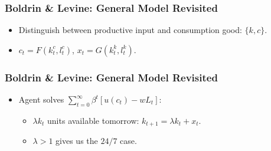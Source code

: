 \documentclass{beamer}
\begin{document}
\begin{frame}[t]
  \frametitle{Boldrin \& Levine: General Model Revisited}
  \begin{itemize}
    \item<+-> Distinguish between productive input and consumption good: $\{k,c\}$.
    \item<+-> $c_t = F(k_t^c,l_t^c)$, $x_t = G(k_t^k,l_t^k)$.
  \end{itemize}
\end{frame}

\begin{frame}[t]
  \frametitle{Boldrin \& Levine: General Model Revisited}
  \begin{itemize}
	  \item<+-> Agent solves $\sum_{t=0}^\infty\beta^t[u(c_t)-wL_t]$:
	  \begin{itemize}
        \item<+-> $\lambda k_t$ units available tomorrow: $k_{t+1} = \lambda k_t + x_t$.
	    \item<+-> $\lambda > 1$ gives us the $24/7$ case.
	  \end{itemize}
  \end{itemize}
\end{frame}
\end{document}
